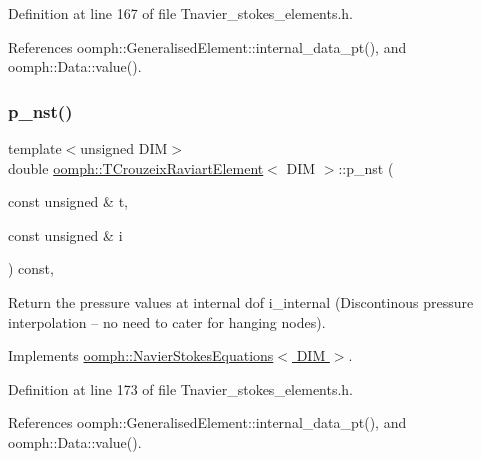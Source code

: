 Definition at line 167 of file Tnavier\+\_\+stokes\+\_\+elements.\+h.



References oomph\+::\+Generalised\+Element\+::internal\+\_\+data\+\_\+pt(), and oomph\+::\+Data\+::value().

\mbox{\label{classoomph_1_1TCrouzeixRaviartElement_adc29dd0f602b9958c5e3f34518ba35ae}} 
\subsubsection{\texorpdfstring{p\+\_\+nst()}{p\_nst()}\hspace{0.1cm}{\footnotesize\ttfamily [2/2]}}
{\footnotesize\ttfamily template$<$unsigned D\+IM$>$ \\
double \hyperlink{classoomph_1_1TCrouzeixRaviartElement}{oomph\+::\+T\+Crouzeix\+Raviart\+Element}$<$ D\+IM $>$\+::p\+\_\+nst (\begin{DoxyParamCaption}\item[{const unsigned \&}]{t,  }\item[{const unsigned \&}]{i }\end{DoxyParamCaption}) const\hspace{0.3cm}{\ttfamily [inline]}, {\ttfamily [virtual]}}



Return the pressure values at internal dof i\+\_\+internal (Discontinous pressure interpolation -- no need to cater for hanging nodes). 



Implements \hyperlink{classoomph_1_1NavierStokesEquations_a0a39f638a61fd9a6c999c16e94deb31b}{oomph\+::\+Navier\+Stokes\+Equations$<$ D\+I\+M $>$}.



Definition at line 173 of file Tnavier\+\_\+stokes\+\_\+elements.\+h.



References oomph\+::\+Generalised\+Element\+::internal\+\_\+data\+\_\+pt(), and oomph\+::\+Data\+::value().

\mbox{\label{classoomph_1_1TCrouzeixRaviartElement_aed5a8e922aff987b4edcad608732be2b}} 
